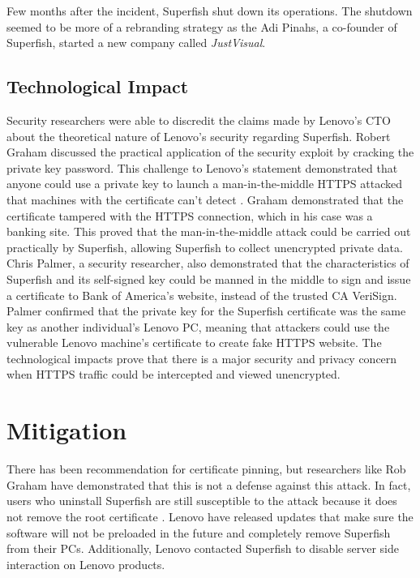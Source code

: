 \documentclass[journal]{IEEEtran}
\begin{document}
Few months after the incident, Superfish shut down its operations. The shutdown seemed to be more of a rebranding strategy as the Adi Pinahs, a co-founder of Superfish, started a new company called \textit{JustVisual}.

\subsection{Technological Impact}
Security researchers were able to discredit the claims made by Lenovo's CTO about the theoretical nature of Lenovo's security regarding Superfish. Robert Graham discussed the practical application of the security exploit by cracking the private key password. This challenge to Lenovo's statement demonstrated that anyone could use a private key to launch a man-in-the-middle HTTPS attacked that machines with the certificate can't detect \cite{arstechnica_lenovo}. Graham demonstrated that the certificate tampered with the HTTPS connection, which in his case was a banking site. This proved that the man-in-the-middle attack could be carried out practically by Superfish, allowing Superfish to collect unencrypted private data. Chris Palmer, a security researcher, also demonstrated that the characteristics of Superfish and its self-signed key could be manned in the middle to sign and issue a certificate to Bank of America's website, instead of the trusted CA VeriSign. Palmer confirmed that the private key for the Superfish certificate was the same key as another individual's Lenovo PC, meaning that attackers could use the vulnerable Lenovo machine's certificate to create fake HTTPS website. The technological impacts prove that there is a major security and privacy concern when HTTPS traffic could be intercepted and viewed unencrypted.

\section{Mitigation}
There has been recommendation for certificate pinning, but researchers like Rob Graham have demonstrated that this is not a defense against this attack. In fact, users who uninstall Superfish are still susceptible to the attack because it does not remove the root certificate \cite{slate_lenovo}. Lenovo have released updates that make sure the software will not be preloaded in the future and completely remove Superfish from their PCs. Additionally, Lenovo contacted Superfish to disable server side interaction on Lenovo products\cite{lenovo_superfish}.
\end{document}
